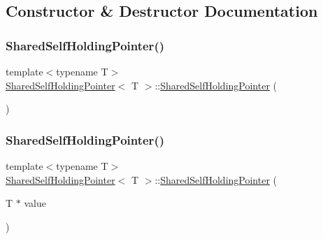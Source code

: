 \subsection{Constructor \& Destructor Documentation}
\mbox{\label{classSharedSelfHoldingPointer_a4a81e4be5cf4c074d92122b05ef1a7bf}} 
\subsubsection{\texorpdfstring{Shared\+Self\+Holding\+Pointer()}{SharedSelfHoldingPointer()}\hspace{0.1cm}{\footnotesize\ttfamily [1/3]}}
{\footnotesize\ttfamily template$<$typename T$>$ \\
\hyperlink{classSharedSelfHoldingPointer}{Shared\+Self\+Holding\+Pointer}$<$ T $>$\+::\hyperlink{classSharedSelfHoldingPointer}{Shared\+Self\+Holding\+Pointer} (\begin{DoxyParamCaption}{ }\end{DoxyParamCaption})\hspace{0.3cm}{\ttfamily [inline]}}

\mbox{\label{classSharedSelfHoldingPointer_af7081c7427461f6a84765a5c6373f2d4}} 
\subsubsection{\texorpdfstring{Shared\+Self\+Holding\+Pointer()}{SharedSelfHoldingPointer()}\hspace{0.1cm}{\footnotesize\ttfamily [2/3]}}
{\footnotesize\ttfamily template$<$typename T$>$ \\
\hyperlink{classSharedSelfHoldingPointer}{Shared\+Self\+Holding\+Pointer}$<$ T $>$\+::\hyperlink{classSharedSelfHoldingPointer}{Shared\+Self\+Holding\+Pointer} (\begin{DoxyParamCaption}\item[{T $\ast$}]{value }\end{DoxyParamCaption})\hspace{0.3cm}{\ttfamily [inline]}}

